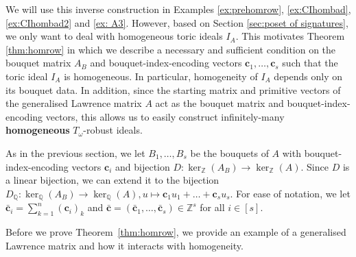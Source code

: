 \documentclass[a4paper, 12pt]{article}
\newcommand{\QQ}{\mathbb Q}
\newcommand{\ZZ}{\mathbb Z}
\theoremstyle{plain}
\theoremstyle{definition}
\theoremstyle{remark}
\begin{document}
We will use this inverse construction in Examples \ref{ex:prehomrow}, \ref{ex:CIhombad}, \ref{ex:CIhombad2} and \ref{ex: A3}. However, based on Section \ref{sec:poset of signatures}, we only want to deal with homogeneous toric ideals $I_A$.
This motivates Theorem \ref{thm:homrow} in which we describe a necessary and sufficient condition on the bouquet matrix $A_B$ and bouquet-index-encoding vectors $\mathbf{c}_1,\dots ,\mathbf{c}_s$ such that the toric ideal $I_A$ is homogeneous. In particular, homogeneity of $I_A$ depends only on its bouquet data. In addition, since the starting matrix and primitive vectors of the generalised Lawrence matrix $A$ act as the bouquet matrix and bouquet-index-encoding vectors, this allows us to easily construct infinitely-many \textbf{homogeneous} $T_{\omega}$-robust ideals.  

As in the previous section, we let $B_1,\dots,B_s$ be the bouquets of $A$ with bouquet-index-encoding vectors $\mathbf{c}_i$ and bijection $D:\ker_\ZZ(A_B) \rightarrow \ker_\ZZ(A)$. Since $D$ is a linear bijection, we can extend it to the bijection $D_{\QQ}:\ker_\QQ(A_B) \rightarrow \ker_\QQ(A),u \mapsto \mathbf{c}_1 u_1+\dots +\mathbf{c}_s u_s$. For ease of notation, we let $\mathbf{\bar c}_i = \sum_{k=1}^{n} (\mathbf{c}_i)_k$ and $\mathbf{\bar c}=(\mathbf{\bar c}_1,\dots,\mathbf{\bar c}_s) \in \ZZ^s$ for all $i \in [s]$.

Before we prove Theorem~\ref{thm:homrow}, we provide an example of a generalised Lawrence matrix and how it interacts with homogeneity.
\end{document}
